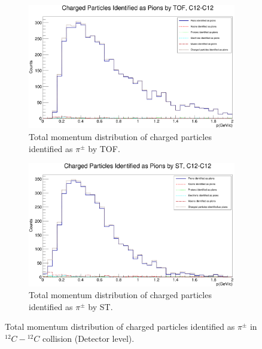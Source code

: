 \documentclass[12pt, twocolumn]{article}
\begin{document}
\begin{figure}[h]
\centering
\begin{subfigure}[h]{0.49\textwidth}
\centering
\includegraphics[scale=0.14]{Detector_pToT_pions(tof)_C12.png}
\caption{Total momentum distribution of charged particles identified as $\pi^{\pm}$ by TOF.}
\label{Detector - Total momentum distribution of pions (TOF) C12.}
\end{subfigure}
\hfill
\begin{subfigure}[h]{0.49\textwidth}
\centering
\includegraphics[scale=0.14]{Detector_pToT_pions(st)_C12.png}
\caption{Total momentum distribution of charged particles identified as $\pi^{\pm}$ by ST.}
\label{Detector - Total momentum distribution of pions (ST) C12.}
\end{subfigure}
\caption{Total momentum distribution of charged particles identified as $\pi^{\pm}$ in $^{12}C-{^{12}C}$ collision (Detector level).}
\label{Total momentum distribution of charged particles identified as pions in C12-C12 collision.}
\end{figure}
\end{document}
